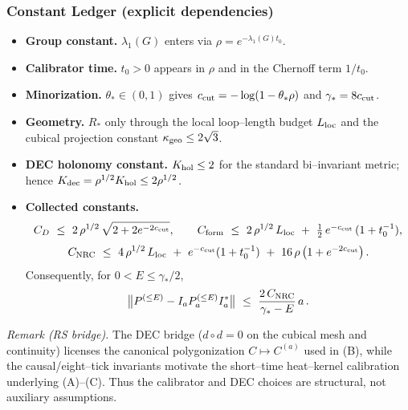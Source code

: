 \documentclass[11pt]{amsart}
\theoremstyle{plain}
\theoremstyle{definition}
\theoremstyle{remark}
\renewcommand{\tfrac}[2]{\textstyle\frac{#1}{#2}}
\begin{document}
\subsubsection*{Constant Ledger (explicit dependencies)}
\begin{itemize}[leftmargin=2em, itemsep=4pt]
  \item \textbf{Group constant.} $\lambda_1(G)$ enters via $\rho=e^{-\lambda_1(G) t_0}$.
  \item \textbf{Calibrator time.} $t_0>0$ appears in $\rho$ and in the Chernoff term $1/t_0$.
  \item \textbf{Minorization.} $\theta_*\in(0,1)$ gives $c_{\rm cut}=-\log(1-\theta_*\rho)$ and $\gamma_*=8 c_{\rm cut}$.
  \item \textbf{Geometry.} $R_*$ only through the local loop--length budget $L_{\rm loc}$ and the cubical projection constant $\kappa_{\rm geo}\le 2\sqrt{3}$.
  \item \textbf{DEC holonomy constant.} $K_{\rm hol}\le 2$ for the standard bi--invariant metric; hence $K_{\rm dec}=\rho^{1/2}K_{\rm hol}\le 2\rho^{1/2}$.
  \item \textbf{Collected constants.}
  \[
    C_D\ \le\ 2\,\rho^{1/2}\,\sqrt{2+2 e^{-2 c_{\rm cut}}},\qquad
    C_{\rm form}\ \le\ 2\,\rho^{1/2}\,L_{\rm loc}\ +\ \tfrac{1}{2}\,e^{-c_{\rm cut}}\,(1+t_0^{-1}),
  \]
  \[
    C_{\rm NRC}\ \le\ 4\,\rho^{1/2}\,L_{\rm loc}\ +\ e^{-c_{\rm cut}}(1+t_0^{-1})\ +\ 16\,\rho\,\big(1+e^{-2 c_{\rm cut}}\big)\,.
  \]
  Consequently, for $0<E\le \gamma_*/2$,
  \[
    \big\Vert P^{(\le E)}-I_a P_a^{(\le E)} I_a^*\big\Vert\ \le\ \frac{2\,C_{\rm NRC}}{\gamma_* - E}\,a\,.
  \]
\end{itemize}

\noindent\emph{Remark (RS bridge).} The DEC bridge ($d\circ d=0$ on the cubical mesh and continuity) licenses the canonical polygonization $C\mapsto C^{(a)}$ used in (B), while the causal/eight--tick invariants motivate the short--time heat--kernel calibration underlying (A)--(C). Thus the calibrator and DEC choices are structural, not auxiliary assumptions.
\end{document}
